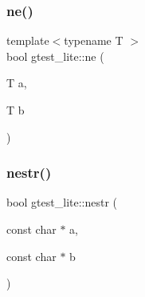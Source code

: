 \subsubsection{\texorpdfstring{ne()}{ne()}}
{\footnotesize\ttfamily template$<$typename T $>$ \\
bool gtest\+\_\+lite\+::ne (\begin{DoxyParamCaption}\item[{T}]{a,  }\item[{T}]{b }\end{DoxyParamCaption})}

\mbox{\label{namespacegtest__lite_a0a34b1bb0d55bc0c6a3e878ec2bcd49f}} 
\subsubsection{\texorpdfstring{nestr()}{nestr()}}
{\footnotesize\ttfamily bool gtest\+\_\+lite\+::nestr (\begin{DoxyParamCaption}\item[{const char $\ast$}]{a,  }\item[{const char $\ast$}]{b }\end{DoxyParamCaption})\hspace{0.3cm}{\ttfamily [inline]}}

